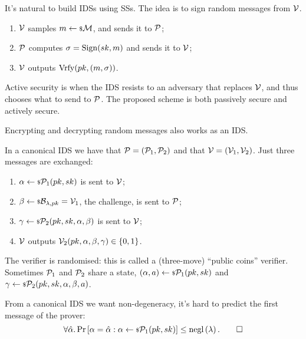It's natural to build \acp{IDS} using \acp{SS}.
The idea is to sign random messages from $\V$.
\begin{enumerate}
	\item $\V$ samples $m \rand{\M}$, and sends it to $\P$;
	\item $\P$ computes $\sigma = \Sign(\sk, m)$ and sends it to $\V$;
	\item $\V$ outputs $\Vrfy(\pk, (m, \sigma))$.
\end{enumerate}

Active security is when the \ac{IDS} resists to an adversary that replaces $\V$, and thus chooses what to send to $\P$.
The proposed scheme is both passively secure and actively secure.

Encrypting and decrypting random messages also works as an \ac{IDS}.

\begin{definition}
	In a canonical \ac{IDS} we have that $\P = (\P_1, \P_2)$ and that $\V = (\V_1, \V_2)$.
	Just three messages are exchanged:
	\begin{enumerate}
		\item $\alpha \rand{\P_1(\pk, \sk)}$ is sent to $\V$;
		\item $\beta \rand{\B_{\lambda, \pk}} = \V_1$, the challenge, is sent to $\P$;
		\item $\gamma \rand{\P_2(\pk, \sk, \alpha, \beta)}$ is sent to $\V$;
		\item $\V$ outputs $\V_2(\pk, \alpha, \beta, \gamma) \in \{0,1\}$.
	\end{enumerate}
	The verifier is randomised: this is called a (three-move) ``public coins'' verifier.
	Sometimes $\P_1$ and $\P_2$ share a state, \ie $(\alpha, a) \rand{\P_1(\pk, \sk)}$ and $\gamma \rand{\P_2(\pk, \sk, \alpha, \beta, a)}$.

	From a canonical \ac{IDS} we want non-degeneracy, \ie it's hard to predict the first message of the prover:
	\begin{equation*}
		\forall \hat{\alpha} . \Pr{\alpha = \hat{\alpha} : \alpha \rand{\P_1(\pk, \sk)}} \le \negl{\lambda}. \qedhere
	\end{equation*}
\end{definition}

